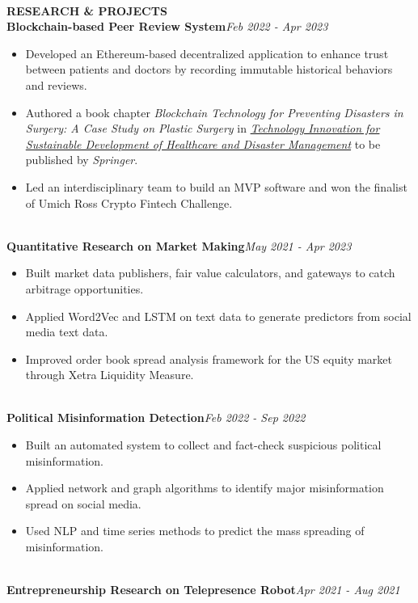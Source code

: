 \documentclass[10pt,a4paper]{article}
\begin{document}
\noindent\\
\rlap{\rule[-1mm]{\linewidth}{.5mm}}\textbf{\large{RESEARCH \& PROJECTS}}\\
\textbf{Blockchain-based Peer Review System}\hfill\emph{Feb 2022 - Apr 2023}
\begin{itemize}[noitemsep,topsep=0pt]
    \item Developed an Ethereum-based decentralized application to enhance trust between patients and doctors by recording immutable historical behaviors and reviews.
    \item Authored a book chapter \emph{Blockchain Technology for Preventing Disasters in Surgery: A Case Study on Plastic Surgery} in \href{https://link.springer.com/book/9789819720484}{\emph{Technology Innovation for Sustainable Development of Healthcare and Disaster Management}} to be published by \emph{Springer}.
    \item Led an interdisciplinary team to build an MVP software and won the finalist of Umich Ross Crypto Fintech Challenge.
\end{itemize}
\noindent\\
\textbf{Quantitative Research on Market Making}\hfill \emph{May 2021 - Apr 2023}
\begin{itemize}[noitemsep,topsep=0pt]
    \item Built market data publishers, fair value calculators, and gateways to catch arbitrage opportunities.
    \item Applied Word2Vec and LSTM on text data to generate predictors from social media text data.
    \item Improved order book spread analysis framework for the US equity market through Xetra Liquidity Measure.

\end{itemize}
\noindent\\
\textbf{Political Misinformation Detection}\hfill \emph{Feb 2022 - Sep 2022}
\begin{itemize}[noitemsep,topsep=0pt]
    \item Built an automated system to collect and fact-check suspicious political misinformation.
    \item Applied network and graph algorithms to identify major misinformation spread on social media.
    \item Used NLP and time series methods to predict the mass spreading of misinformation.
\end{itemize}
\noindent\\
\textbf{Entrepreneurship Research on Telepresence Robot}\hfill \emph{Apr 2021 - Aug 2021}
\end{document}
